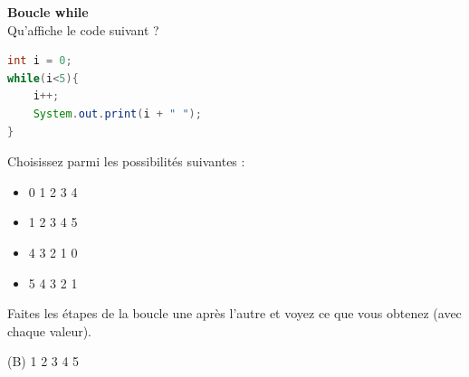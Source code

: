    
    \begin{Exercice}[5 minutes] [Java] \textbf{Boucle while}\\
      	Qu'affiche le code suivant ?
      	
      	\begin{lstlisting}[language=Java]
int i = 0;
while(i<5){
    i++;
    System.out.print(i + " ");
}
     	\end{lstlisting}
             	
        Choisissez parmi les possibilités suivantes :
        
        \begin{itemize}
        
        \item[(A)] 0 
        1 
        2 
        3 
        4 
        \item[(B)] 1  
        2 
        3 
        4 
        5 
        \item[(C)] 4 
        3 
        2 
        1 
        0 
        \item[(D)] 5 
        4 
        3 
        2 
        1
        \end{itemize}
    
        \begin{conseil}
		   Faites les étapes de la boucle une après l'autre et voyez ce que vous obtenez (avec chaque valeur).  
        \end{conseil}
        
        \begin{solution}
          (B)  1 
            2 
            3 
            4 
            5
        \end{solution}
    \end{Exercice} 
	
